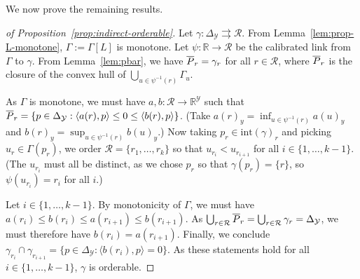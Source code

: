 \documentclass[anon]{colt2020} %
\newcommand{\reals}{\mathbb{R}}
\newcommand{\prop}[1]{\Gamma[#1]}
\newcommand{\simplex}{\Delta_\Y}
\newcommand{\R}{\mathcal{R}}
\newcommand{\Y}{\mathcal{Y}}
\newcommand{\inprod}[2]{\langle #1, #2 \rangle}%
\newcommand{\inter}[1]{\mathrm{int}(#1)}%
\newcommand{\toto}{\rightrightarrows}
\begin{document}
We now prove the remaining results.
\begin{proof}[of Proposition~\ref{prop:indirect-orderable}]
	Let $\gamma:\simplex\toto\R$.
	From Lemma~\ref{lem:prop-L-monotone}, $\Gamma := \prop{L}$ is monotone.
	Let $\psi:\reals\to\R$ be the calibrated link from $\Gamma$ to $\gamma$.
	From Lemma~\ref{lem:pbar}, we have $\overline P_r = \gamma_r$ for all $r\in\R$, where $\overline P_r$ is the closure of the convex hull of $\bigcup_{u\in\psi^{-1}(r)} \Gamma_u$.
	
	As $\Gamma$ is monotone, we must have $a,b : \R\to\reals^\Y$ such that $\Pbar_r = \{p\in\simplex : \inprod{a(r)}{p} \leq 0 \leq \inprod{b(r)}{p} \}$.
	(Take $a(r)_y = \inf_{u\in\psi^{-1}(r)} a(u)_y$ and $b(r)_y = \sup_{u\in\psi^{-1}(r)} b(u)_y$.)
	Now taking $p_r\in\inter\gamma_r$ and picking $u_r \in \Gamma(p_r)$, we order $\R = \{r_1,\ldots,r_k\}$ so that $u_{r_i} < u_{r_{i+1}}$ for all $i\in\{1,\ldots,k-1\}$.
	(The $u_{r_i}$ must all be distinct, as we chose $p_r$ so that $\gamma(p_r) = \{r\}$, so $\psi(u_{r_i}) = r_i$ for all $i$.)
	
	Let $i\in\{1,\ldots,k-1\}$.
	By monotonicity of $\Gamma$, we must have $a(r_i) \leq b(r_i) \leq a(r_{i+1}) \leq b(r_{i+1})$.
	As $\bigcup_{r\in\R} \Pbar_r = \bigcup_{r\in\R} \gamma_r = \simplex$, we must therefore have $b(r_i) = a(r_{i+1})$.
	Finally, we conclude $\gamma_{r_i} \cap \gamma_{r_{i+1}} = \{p\in\simplex : \inprod{b(r_i)}{p} = 0\}$.
	As these statements hold for all $i\in\{1,\ldots,k-1\}$, $\gamma$ is orderable.
\end{proof}
\end{document}
